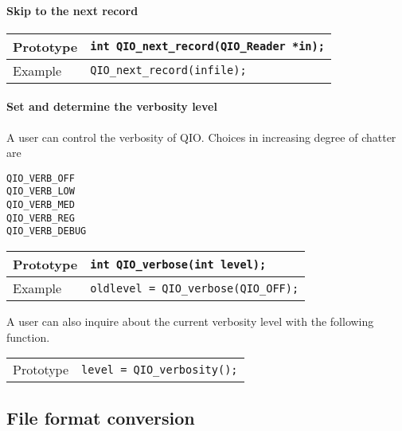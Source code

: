 \documentclass{article}
\begin{document}
\paragraph{Skip to the next record}

\begin{flushleft}
  \begin{tabular}{|l|l|}
  \hline
  Prototype      & \verb|int QIO_next_record(QIO_Reader *in);| \\
\hline
  Example  & \verb|QIO_next_record(infile);|\\
   \hline
 \end{tabular}
\end{flushleft}
%

\paragraph{Set and determine the verbosity level}

A user can control the verbosity of QIO\@.  Choices in increasing
degree of chatter are
%
\begin{verbatim}
QIO_VERB_OFF   
QIO_VERB_LOW   
QIO_VERB_MED   
QIO_VERB_REG   
QIO_VERB_DEBUG 
\end{verbatim}
%
\begin{flushleft}
  \begin{tabular}{|l|l|}
  \hline
  Prototype      & \verb|int QIO_verbose(int level);| \\
\hline
  Example  & \verb|oldlevel = QIO_verbose(QIO_OFF);|\\
   \hline
 \end{tabular}
\end{flushleft}
%

A user can also inquire about the current verbosity level with the
following function.

%
\begin{flushleft}
  \begin{tabular}{|l|l|}
  \hline
  Prototype      & \verb|level = QIO_verbosity();| \\
 \end{tabular}
\end{flushleft}
%


\subsection{File format conversion}
\end{document}
